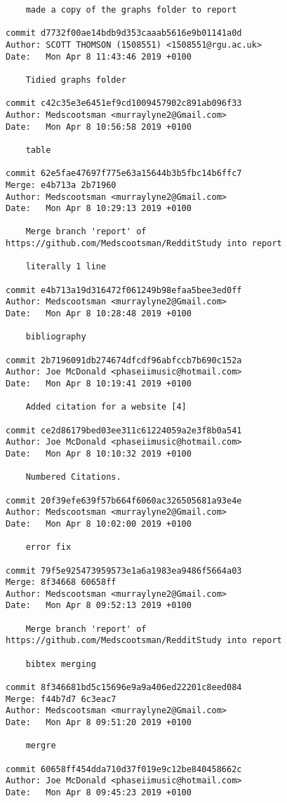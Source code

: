 \begin{lstlisting}
    made a copy of the graphs folder to report

commit d7732f00ae14bdb9d353caaab5616e9b01141a0d
Author: SCOTT THOMSON (1508551) <1508551@rgu.ac.uk>
Date:   Mon Apr 8 11:43:46 2019 +0100

    Tidied graphs folder

commit c42c35e3e6451ef9cd1009457902c891ab096f33
Author: Medscootsman <murraylyne2@Gmail.com>
Date:   Mon Apr 8 10:56:58 2019 +0100

    table

commit 62e5fae47697f775e63a15644b3b5fbc14b6ffc7
Merge: e4b713a 2b71960
Author: Medscootsman <murraylyne2@Gmail.com>
Date:   Mon Apr 8 10:29:13 2019 +0100

    Merge branch 'report' of https://github.com/Medscootsman/RedditStudy into report
    
    literally 1 line

commit e4b713a19d316472f061249b98efaa5bee3ed0ff
Author: Medscootsman <murraylyne2@Gmail.com>
Date:   Mon Apr 8 10:28:48 2019 +0100

    bibliography

commit 2b7196091db274674dfcdf96abfccb7b690c152a
Author: Joe McDonald <phaseiimusic@hotmail.com>
Date:   Mon Apr 8 10:19:41 2019 +0100

    Added citation for a website [4]

commit ce2d86179bed03ee311c61224059a2e3f8b0a541
Author: Joe McDonald <phaseiimusic@hotmail.com>
Date:   Mon Apr 8 10:10:32 2019 +0100

    Numbered Citations.

commit 20f39efe639f57b664f6060ac326505681a93e4e
Author: Medscootsman <murraylyne2@Gmail.com>
Date:   Mon Apr 8 10:02:00 2019 +0100

    error fix

commit 79f5e925473959573e1a6a1983ea9486f5664a03
Merge: 8f34668 60658ff
Author: Medscootsman <murraylyne2@Gmail.com>
Date:   Mon Apr 8 09:52:13 2019 +0100

    Merge branch 'report' of https://github.com/Medscootsman/RedditStudy into report
    
    bibtex merging

commit 8f346681bd5c15696e9a9a406ed22201c8eed084
Merge: f44b7d7 6c3eac7
Author: Medscootsman <murraylyne2@Gmail.com>
Date:   Mon Apr 8 09:51:20 2019 +0100

    mergre

commit 60658ff454dda710d37f019e9c12be840458662c
Author: Joe McDonald <phaseiimusic@hotmail.com>
Date:   Mon Apr 8 09:45:23 2019 +0100


\end{lstlisting}
